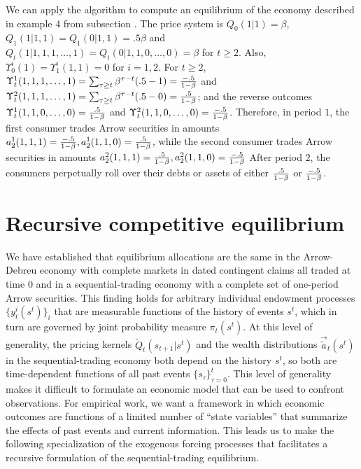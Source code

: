\medskip


We can apply the algorithm to compute an equilibrium of the economy described in  example 4 from subsection . 
The price system is $Q_0(1\big|1) =\beta$, 
$Q_1(1\big|1,1) = Q_1(0\big|1,1) = .5 \beta$  and
$Q_t(1\big|1,1,1,\ldots,1) = Q_t(0\big|1,1,0,\ldots,0) 
= \beta $ for $t \geq 2$.
Also, $\Upsilon^i_0(1) = \Upsilon^i_1(1,1)= 0$ for $i=1,2$.  For $t \geq 2$,
$\Upsilon_t^1 (1,1,1, \ldots,1)= \sum_{\tau \geq t} \beta^{\tau - t}(.5 -1) = {-.5 \over 1-\beta}$ and
$\Upsilon_t^2(1,1,1, \ldots,1) = \sum_{\tau \geq t} \beta^{\tau - t}(.5 -0) = {.5 \over 1-\beta}$; and
the reverse outcomes  
$\Upsilon_t^1 (1,1,0, \ldots,0)= {.5 \over 1-\beta}$ and
$\Upsilon_t^2 (1,1,0, \ldots,0)= {-.5 \over 1-\beta}$.
Therefore, in period $1$, the first  consumer trades Arrow securities in amounts $a_2^1(1,1,1) = {-.5 \over 1-\beta},
a_2^1(1,1,0) = {.5 \over 1-\beta}$, while the second consumer trades  Arrow securities in amounts 
$a_2^2(1,1,1) = {.5 \over 1-\beta},
a_2^2(1,1,0) = {-.5 \over 1-\beta}$   After period $2$, the consumers perpetually roll over their debts or assets of either
${.5 \over 1-\beta}$ or ${-.5 \over 1 - \beta}$.






\section{Recursive competitive equilibrium}\label{sec:Markovs}%
We have established that  equilibrium allocations are the same
in the Arrow-Debreu economy with  complete markets in dated
contingent claims all traded at time 0 and in a sequential-trading
economy with a complete set of one-period Arrow securities. This finding
holds for arbitrary individual endowment processes
$\{y^i_t(s^t)\}_i$ that are measurable functions of the history of
events $s^t$, which in turn are governed by joint
probability measure $\pi_t(s^t)$. At this level of generality,
 the pricing kernels $\tilde Q_t(s_{t+1} | s^t)$ and the
wealth distributions $\vec {\tilde a}_t(s^t)$ in the
sequential-trading economy both depend on the history $s^t$, so both
 are time-dependent functions of all past events
$\{s_\tau\}_{\tau=0}^t$. This level of generality  makes it  difficult to
formulate an economic model that can be used to confront
observations. For empirical work, we want  a framework in which economic outcomes
are functions of a limited number of ``state variables'' that
summarize the effects of past events and current information. This
 leads us to make the following specialization of the
exogenous forcing processes that facilitates a recursive formulation
of the sequential-trading equilibrium.


